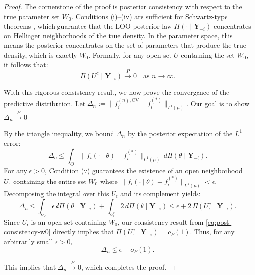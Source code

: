 \documentclass[
  12pt]{article}
\theoremstyle{plain}
\theoremstyle{definition}
\theoremstyle{remark}
\begin{document}
\begin{proof}
The cornerstone of the proof is posterior consistency with respect to the true parameter set $W_0$. Conditions (i)–(iv) are sufficient for Schwartz-type theorems \citep{ghosal2007convergence, Choi2008Remarks}, which guarantee that the LOO posterior law $\Pi(\cdot \mid \mathbf{Y}_{-i})$ concentrates on Hellinger neighborhoods of the true density. In the parameter space, this means the posterior concentrates on the set of parameters that produce the true density, which is exactly $W_0$. Formally, for any open set $U$ containing the set $W_0$, it follows that:
\begin{equation} \label{eq:post-consistency-w0}
\Pi(U^c\mid\mathbf Y_{-i}) \xrightarrow{P} 0 \quad \text{as } n\to\infty.
\end{equation}

With this rigorous consistency result, we now prove the convergence of the predictive distribution. Let $\Delta_n := \|f_i^{(n),\mathrm{CV}}-f_i^{(*)}\|_{L^1(\mu)}$. Our goal is to show $\Delta_n \xrightarrow{P} 0$.

By the triangle inequality, we bound $\Delta_n$ by the posterior expectation of the $L^1$ error:
\begin{equation}\Delta_n \le \int_{\Theta} \|f_i(\cdot\mid\theta)-f_i^{(*)}\|_{L^1(\mu)}\,d\Pi(\theta\mid\mathbf Y_{-i}).\end{equation}For any $\epsilon > 0$, Condition (v) guarantees the existence of an open neighborhood $U_\epsilon$ containing the entire set $W_0$ where $\|f_i(\cdot\mid\theta)-f_i^{(*)}\|_{L^1(\mu)} < \epsilon$. Decomposing the integral over this $U_\epsilon$ and its complement yields:\begin{equation}\Delta_n \le \int_{U_\epsilon} \epsilon \,d\Pi(\theta\mid\mathbf Y_{-i}) + \int_{U_\epsilon^c} 2 \,d\Pi(\theta\mid\mathbf Y_{-i}) \le \epsilon + 2\,\Pi(U_\epsilon^c\mid\mathbf Y_{-i}).\end{equation}
Since $U_\epsilon$ is an open set containing $W_0$, our consistency result from \eqref{eq:post-consistency-w0} directly implies that $\Pi(U_\epsilon^c\mid\mathbf Y_{-i}) = o_P(1)$. Thus, for any arbitrarily small $\epsilon > 0$,\begin{equation}\Delta_n \le \epsilon + o_P(1).\end{equation}

This implies that $\Delta_n \xrightarrow{P} 0$, which completes the proof.
\end{proof}
\end{document}
